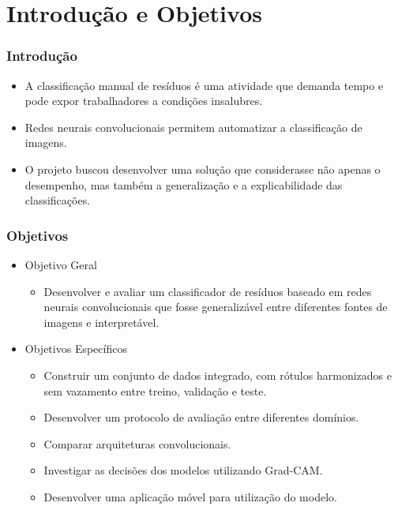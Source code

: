 \section{Introdução e Objetivos}

\begin{frame}

    \frametitle{Introdução}

    \begin{itemize}
	 	\item A classificação manual de resíduos é uma atividade que demanda tempo e pode expor trabalhadores a condições insalubres.
	 	\item Redes neurais convolucionais permitem automatizar a classificação de imagens.
    	\item O projeto buscou desenvolver uma solução que considerasse não apenas o desempenho, mas também a generalização e a explicabilidade das classificações.    	
    \end{itemize} 
    
\end{frame}

\begin{frame}

    \frametitle{Objetivos}

    \begin{itemize}
    
        \item Objetivo Geral
            \begin{itemize}
                \item Desenvolver e avaliar um classificador de resíduos baseado em redes neurais convolucionais que fosse generalizável entre diferentes fontes de imagens e interpretável.
            \end{itemize}
            
        \item Objetivos Específicos
            \begin{itemize}
            	\item Construir um conjunto de dados integrado, com rótulos harmonizados e sem vazamento entre treino, validação e teste.         	
            	\item Desenvolver um protocolo de avaliação entre diferentes domínios.
            	\item Comparar arquiteturas convolucionais.
            	\item Investigar as decisões dos modelos utilizando Grad-CAM.
            	\item Desenvolver uma aplicação móvel para utilização do modelo.
                                
            \end{itemize}
            
    \end{itemize}

\end{frame}